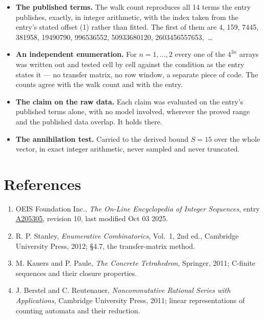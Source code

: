 \documentclass[11pt]{article}
\theoremstyle{definition}
\begin{document}
\begin{itemize}

\item {\bfseries The published terms.} The walk count reproduces all 14 terms the entry publishes, exactly, in integer arithmetic, with the index taken from the entry's stated offset (1) rather than fitted. The first of them are 4, 159, 7445, 381958, 19490790, 996536552, 50933680120, 2603456557653,~\dots

\item {\bfseries An independent enumeration.} For $n = 1,\dots,2$ every one of the $4^{3n}$ arrays was written out and tested cell by cell against the condition as the entry states it --- no transfer matrix, no row window, a separate piece of code. The counts agree with the walk count and with the entry.

\item {\bfseries The claim on the raw data.} Each claim was evaluated on the entry's published terms alone, with no model involved, wherever the proved range and the published data overlap. It holds there.

\item {\bfseries The annihilation test.} Carried to the derived bound $S = 15$ over the whole vector, in exact integer arithmetic, never sampled and never truncated.

\end{itemize}

\section{References}

\begin{enumerate}

\item OEIS Foundation Inc., \emph{The On-Line Encyclopedia of Integer Sequences}, entry \href{https://oeis.org/A205305}{A205305}, revision 10, last modified Oct 03 2025.

\item R. P. Stanley, \emph{Enumerative Combinatorics}, Vol.~1, 2nd ed., Cambridge University Press, 2012; \S4.7, the transfer-matrix method.

\item M. Kauers and P. Paule, \emph{The Concrete Tetrahedron}, Springer, 2011; C-finite sequences and their closure properties.

\item J. Berstel and C. Reutenauer, \emph{Noncommutative Rational Series with Applications}, Cambridge University Press, 2011; linear representations of counting automata and their reduction.

\end{enumerate}
\end{document}

